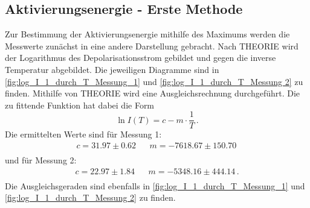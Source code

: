\subsection{Aktivierungsenergie - Erste Methode}
  Zur Bestimmung der Aktivierungsenergie mithilfe des Maximums werden die Messwerte zunächst in eine andere Darstellung gebracht.
  Nach THEORIE wird der Logarithmus des Depolarisationsstrom gebildet und gegen die inverse Temperatur abgebildet.
  Die jeweiligen Diagramme sind in \autoref{fig:log_I_1_durch_T_Messung_1} und \autoref{fig:log_I_1_durch_T_Messung 2} zu finden.
  Mithilfe von THEORIE wird eine Ausgleichsrechnung durchgeführt.
  Die zu fittende Funktion hat dabei die Form
  \begin{equation*}
    \ln{I(T)} = c - m \cdot \frac{1}{T} \, .
  \end{equation*}
  Die ermittelten Werte sind für Messung 1:
  \begin{align*}
    c =  31.97 \pm  0.62 && m = -7618.67 \pm 150.70  \,  \\
  \end{align*}
  und für Messung 2:
  \begin{align*}
    c = 22.97 \pm  1.84 && m = -5348.16 \pm 444.14  \, . \\
  \end{align*}
  Die Ausgleichsgeraden sind ebenfalls in \autoref{fig:log_I_1_durch_T_Messung_1} und \autoref{fig:log_I_1_durch_T_Messung 2} zu finden.

